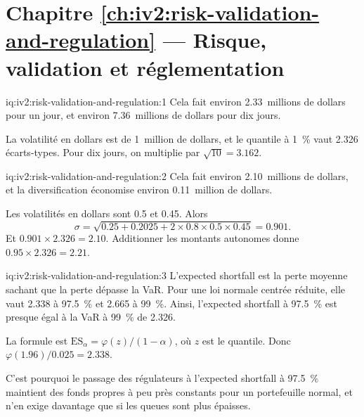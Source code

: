 \section*{Chapitre \ref{ch:iv2:risk-validation-and-regulation} --- Risque, validation et réglementation}

\begin{solution}{iq:iv2:risk-validation-and-regulation:1}
Cela fait environ 2.33~millions de dollars pour un jour, et environ 7.36~millions de dollars pour dix jours.

La volatilité en dollars est de 1~million de dollars, et le quantile à 1~\% vaut 2.326 écarts-types. Pour dix jours, on multiplie par $\sqrt{10} = 3.162$.

\end{solution}

\begin{solution}{iq:iv2:risk-validation-and-regulation:2}
Cela fait environ 2.10~millions de dollars, et la diversification économise environ 0.11~million de dollars.

Les volatilités en dollars sont 0.5 et 0.45. Alors
\[
\sigma = \sqrt{0.25 + 0.2025 + 2 \times 0.8 \times 0.5 \times 0.45} = 0.901.
\]
Et $0.901 \times 2.326 = 2.10$. Additionner les montants autonomes donne $0.95 \times 2.326 = 2.21$.

\end{solution}

\begin{solution}{iq:iv2:risk-validation-and-regulation:3}
L'expected shortfall est la perte moyenne sachant que la perte dépasse la VaR. Pour une loi normale centrée réduite, elle vaut 2.338 à 97.5~\% et 2.665 à 99~\%. Ainsi, l'expected shortfall à 97.5~\% est presque égal à la VaR à 99~\% de 2.326.

La formule est $\mathrm{ES}_{\alpha} = \varphi(z)/(1 - \alpha)$, où $z$ est le quantile. Donc $\varphi(1.96)/0.025 = 2.338$.

C'est pourquoi le passage des régulateurs à l'expected shortfall à 97.5~\% maintient des fonds propres à peu près constants pour un portefeuille normal, et n'en exige davantage que si les queues sont plus épaisses.

\end{solution}

